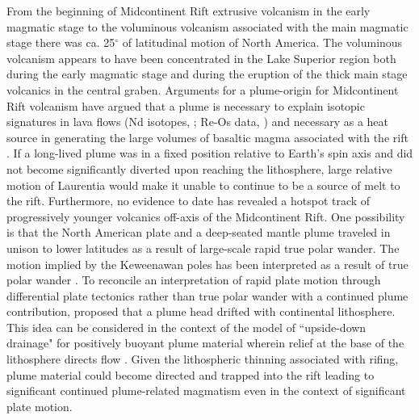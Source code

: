 \documentclass[draft,gc]{AGUTeX}
\begin{document}
\begin{article}
From the beginning of Midcontinent Rift extrusive volcanism in the early magmatic stage to the voluminous volcanism associated with the main magmatic stage there was ca. 25$^\circ$ of latitudinal motion of North America. The voluminous volcanism appears to have been concentrated in the Lake Superior region both during the early magmatic stage and during the eruption of the thick main stage volcanics in the central graben. Arguments for a plume-origin for Midcontinent Rift volcanism have argued that a plume is necessary to explain isotopic signatures in lava flows (Nd isotopes, \citet{Nicholson1997a}; Re-Os data, \citet{Shirey1997a}) and necessary as a heat source in generating the large volumes of basaltic magma associated with the rift \citep{Cannon1992b}. If a long-lived plume was in a fixed position relative to Earth's spin axis and did not become significantly diverted upon reaching the lithosphere, large relative motion of Laurentia would make it unable to continue to be a source of melt to the rift. Furthermore, no evidence to date has revealed a hotspot track of progressively younger volcanics off-axis of the Midcontinent Rift. One possibility is that the North American plate and a deep-seated mantle plume traveled in unison to lower latitudes as a result of large-scale rapid true polar wander. The motion implied by the Keweenawan poles has been interpreted as a result of true polar wander \citep{Evans2003b, Mitchell2012a}.  To reconcile an interpretation of rapid plate motion through differential plate tectonics rather than true polar wander with a continued plume contribution, \citet{Davis1997a} proposed that a plume head drifted with continental lithosphere. This idea can be considered in the context of the model of ``upside-down drainage" for positively buoyant plume material wherein relief at the base of the lithosphere directs flow \citep{Sleep1997a, Ebinger1998a}. Given the lithospheric thinning associated with rifing, plume material could become directed and trapped into the rift leading to significant continued plume-related magmatism even in the context of significant plate motion.


\end{article}
\end{document}
